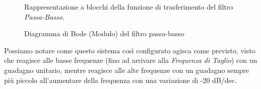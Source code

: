 \documentclass{article}
\begin{document}
\begin{itemize}
\begin{figure}[H]
\begin{tikzpicture}
            \end{tikzpicture}
            \captionsetup{justification=centering, singlelinecheck=false, font=small}
            \caption{Rappresentazione a blocchi della funzione di trasferimento del filtro \textit{Passa-Basso}.}
            \label{fig:blocco_rc}
          \end{figure}
          
          \begin{figure}[H]
            \centering
            
            \captionsetup{justification=centering, singlelinecheck=false, font=small}
            \caption{Diagramma di Bode (Modulo) del filtro passa-basso}
            \label{fig:bode_passabasso_modulo}
          \end{figure}

          Possiamo notare come questo sistema così configurato agisca come previsto,
          visto che reagisce alle basse frequenze (fino ad arrivare alla \textit{Frequenza di Taglio})
          con un guadagno unitario, mentre reagisce alle alte frequenze con un guadagno sempre più
          piccolo all'aumentare della frequenza con una variazione di -20 dB/dec. 
    \newpage


\end{itemize}
\end{document}
